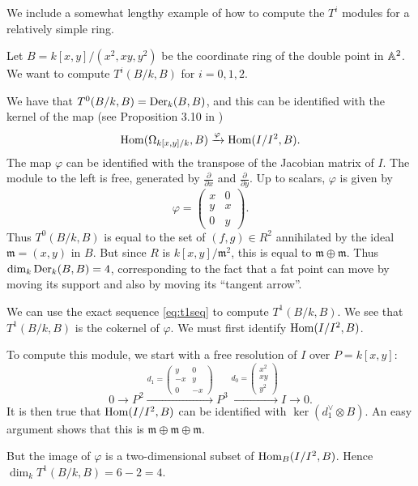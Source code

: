 We include a somewhat lengthy example of how to compute the $T^i$ modules for a relatively simple ring.

\begin{example}
Let $B=k[x,y]/(x^2,xy,y^2)$ be the coordinate ring of the double point in $\mathbb{A}^2$. We want to compute $T^i(B/k,B)$ for $i=0,1,2$. 

We have that $T^0(B/k,B) = \operatorname{Der}_k(B,B)$, and this can be identified with the kernel of the map (see Proposition 3.10 in \cite{hartshorne_deformations})
$$
\operatorname{Hom}(\Omega_{k[x,y]/k},B) \xrightarrow{\varphi} \operatorname{Hom}(I/I^2,B).
$$
The map $\varphi$ can be identified with the transpose of the Jacobian matrix of $I$. The module to the left is free, generated by $\frac{\partial}{\partial x}$ and $\frac{\partial}{\partial y}$. Up to scalars, $\varphi$ is given by 
\[
\varphi = \begin{pmatrix}
x & 0 \\ y & x \\ 0 & y
\end{pmatrix}.
\]
Thus $T^0(B/k,B)$ is equal to the set of $(f,g) \in R^2$ annihilated by the ideal $\mathfrak m = (x,y)$ in $B$. But since $R$ is $k[x,y]/\mathfrak m^2$, this is equal to $\mathfrak m \oplus \mathfrak m$. Thus $\dim_k \operatorname{Der}_k(B,B) = 4$, corresponding to the fact that a fat point can move by moving its support and also by moving its ``tangent arrow''.

We can use the exact sequence \eqref{eq:t1seq} to compute $T^1(B/k,B)$. We see that $T^1(B/k,B)$ is the cokernel of $\varphi$. We must first identify $\operatorname{Hom}(I/I^2,B)$.

To compute this module, we start with a free resolution of $I$ over $P=k[x,y]$:
\[
0 \to 
P^2 \xrightarrow{d_1 = 
	\begin{pmatrix}
	y & 0 \\ -x & y \\ 0  & -x
	\end{pmatrix}
} P^3 \xrightarrow{ d_0 = 
	\begin{pmatrix}
	x^2 \\ xy \\ y^2
	\end{pmatrix}
} I \to 0.
\]
It is then true that $\operatorname{Hom}(I/I^2,B)$ can be identified with $\ker ( d_1^\vee \otimes B)$. An easy argument shows that this is $\mathfrak m \oplus \mathfrak m  \oplus \mathfrak m$.

But the image of $\varphi$ is a two-dimensional subset of $\operatorname{Hom}_B(I/I^2,B)$. Hence $\dim_k T^1(B/k,B) = 6-2=4$.


\end{example}
